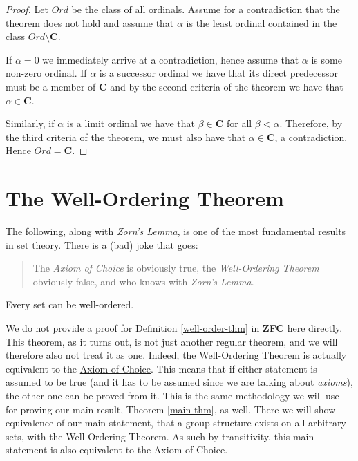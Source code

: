 \documentclass[../../main.tex]{subfiles}
\begin{document}
\begin{proof}
    Let $\mathit{Ord}$ be the class of all ordinals.
    Assume for a contradiction that the theorem does not hold and assume that $\alpha$ is the least ordinal contained in the class $\mathit{Ord} \setminus \mathbf{C}$.
    
    If $\alpha = 0$ we immediately arrive at a contradiction, hence assume that $\alpha$ is some non-zero ordinal.
    If $\alpha$ is a successor ordinal we have that its direct predecessor must be a member of $\mathbf{C}$ and by the second criteria of the theorem we have that $\alpha \in \mathbf{C}$.
    
    Similarly, if $\alpha$ is a limit ordinal we have that $\beta \in \mathbf{C}$ for all $\beta < \alpha$.
    Therefore, by the third criteria of the theorem, we must also have that $\alpha \in \mathbf{C}$, a contradiction.
    Hence $\mathit{Ord} = \mathbf{C}$.
\end{proof}

\section{The Well-Ordering Theorem}
The following, along with \textit{Zorn's Lemma}, is one of the most fundamental results in set theory.
There is a (bad) joke that goes:
\begin{quote} %
    The \textit{Axiom of Choice} is obviously true, the \textit{Well-Ordering Theorem} obviously false, 
    and who knows with \textit{Zorn's Lemma}.
\end{quote}

\begin{definition}\cite[Theorem 15]{Jec78}\label{well-order-thm}
    \newline Every set can be well-ordered. 
\end{definition}

We do not provide a proof for Definition \ref{well-order-thm} in \textbf{ZFC} here directly.
This theorem, as it turns out, is not just another regular theorem, and we will therefore also not treat it as one.
Indeed, the Well-Ordering Theorem is actually equivalent to the \hyperref[choice-axiom]{Axiom of Choice}.
This means that if either statement is assumed to be true (and it has to be assumed since we are talking about \textit{axioms}),
the other one can be proved from it.
This is the same methodology we will use for proving our main result, Theorem \ref{main-thm}, as well.
There we will show equivalence of our main statement, that a group structure exists on all arbitrary sets, with the Well-Ordering Theorem.
As such by transitivity, this main statement is also equivalent to the Axiom of Choice.
\end{document}
